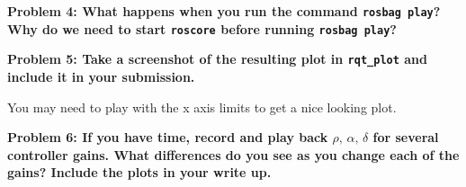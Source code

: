 \documentclass{article}
\begin{document}
\textbf{Problem 4: What happens when you run the command \texttt{rosbag play}? Why do we need to start \texttt{roscore} before running \texttt{rosbag play}?}

\textbf{Problem 5: Take a screenshot of the resulting plot in \texttt{rqt\_plot} and include it in your submission.}

You may need to play with the x axis limits to get a nice looking plot.

\textbf{Problem 6: If you have time, record and play back $\rho, \, \alpha, \, \delta$ for several controller gains. What differences do you see as you change each of the gains? Include the plots in your write up.}
\end{document}
